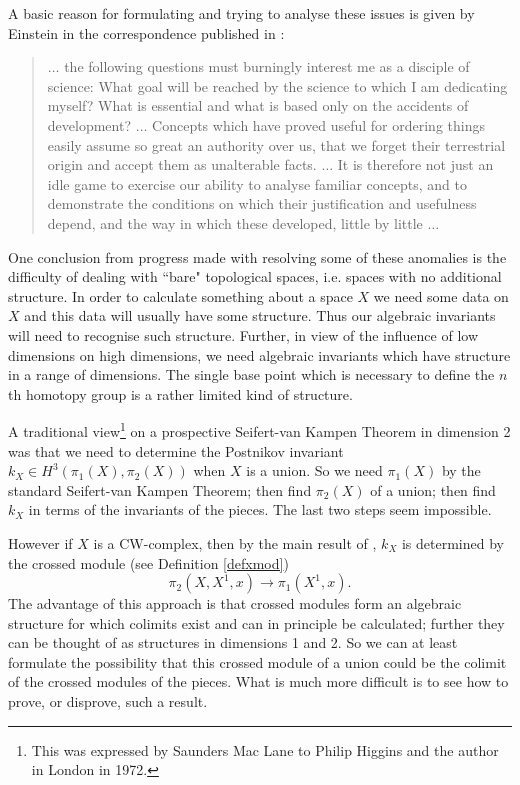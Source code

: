 \documentclass{elsarticle}
\begin{document}
A basic reason for formulating and trying to analyse these issues is given by Einstein in the correspondence published in \cite{Ein90}:

\begin{quote}
$\ldots$  the following questions must burningly interest me as a disciple of science: What goal will be reached by the science to which I am dedicating myself? What is essential and what is based only on the accidents of development? $\ldots$ Concepts which have proved useful for ordering things easily assume so great an authority over us, that we forget their terrestrial origin and accept them as unalterable facts.  $\ldots$  It is therefore not just an idle game to exercise our ability to analyse familiar concepts, and to demonstrate the conditions on which their justification and usefulness depend, and the way in which these developed, little by little $\ldots$
\end{quote}





One conclusion from progress made with resolving some of these anomalies is the difficulty of dealing with ``bare" topological spaces, i.e. spaces with no additional structure. In order to calculate something about a space $X$ we need some data on $X$ and this data will usually have some structure. Thus our algebraic invariants will need to recognise such structure. Further, in view of the influence of low dimensions on high dimensions, we need algebraic invariants which have structure in a range of dimensions. The  single base point which is necessary to define the $n$th homotopy group is a rather limited kind of structure.

A traditional view\footnote{This was expressed  by Saunders Mac Lane to Philip Higgins and the author in London in 1972.  } on a prospective  Seifert-van Kampen Theorem in dimension 2 was that we need to determine the Postnikov invariant $k_X \in  H^3(\pi_1(X),\pi_2(X))$ when $X$ is a union. So we need $\pi_1(X)$ by the standard Seifert-van Kampen Theorem; then find $\pi_2(X)$ of a union; then find $k_X$  in terms of the invariants of the pieces. The last two steps seem impossible.

However if $X$  is a CW-complex, then by the main result of \cite{MacW50}, $k_X$ is determined by the crossed module (see  Definition \ref{defxmod})
$$ \pi_2(X, X^ 1,x) \to  \pi_1(X^1, x).$$
 The advantage of this approach is that crossed modules form an algebraic structure for which colimits exist and can in principle be calculated; further they can be thought of as structures in dimensions 1 and 2.   So we can at least formulate the possibility that this crossed module of a union could be the colimit of the crossed modules of the pieces. What is much more difficult is to see how to prove, or disprove,  such a result.
\end{document}
